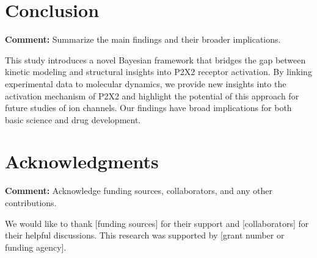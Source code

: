 \documentclass{article}
\begin{document}
	\section{Conclusion}
	\textbf{Comment:} Summarize the main findings and their broader implications.
	
	This study introduces a novel Bayesian framework that bridges the gap between kinetic modeling and structural insights into P2X2 receptor activation. By linking experimental data to molecular dynamics, we provide new insights into the activation mechanism of P2X2 and highlight the potential of this approach for future studies of ion channels. Our findings have broad implications for both basic science and drug development.
	
	\section*{Acknowledgments}
	\textbf{Comment:} Acknowledge funding sources, collaborators, and any other contributions.
	
	We would like to thank [funding sources] for their support and [collaborators] for their helpful discussions. This research was supported by [grant number or funding agency].
	
\end{document}

